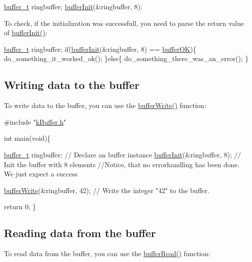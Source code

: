 \begin{DoxyCode}
\hyperlink{structbuffer__t}{buffer\_t} ringbuffer;
\hyperlink{k_buffer_8c_aec18d6ea571b1326dbeb7ca15f4969c0}{bufferInit}(&ringbuffer, 8);
\end{DoxyCode}
 To check, if the initialization was successfull, you need to parse the return value of \hyperlink{k_buffer_8c_aec18d6ea571b1326dbeb7ca15f4969c0}{buffer\+Init()}\+: 
\begin{DoxyCode}
\hyperlink{structbuffer__t}{buffer\_t} ringbuffer;
\textcolor{keywordflow}{if}(\hyperlink{k_buffer_8c_aec18d6ea571b1326dbeb7ca15f4969c0}{bufferInit}(&ringbuffer, 8) == \hyperlink{k_buffer_8h_a7a0bf550b7bd49d85172e409c0034fe6a69e32851bd2f089b06555decd80aac1b}{bufferOK})\{
 do\_something\_it\_worked\_ok();
\}\textcolor{keywordflow}{else}\{
 do\_something\_there\_was\_an\_error();
\}
\end{DoxyCode}
 \hypertarget{index_write}{}\subsection{Writing data to the buffer}\label{index_write}
To write data to the buffer, you can use the \hyperlink{k_buffer_8c_a9d6410a89adf65a3ef12340ecb9bbd55}{buffer\+Write()} function\+: 
\begin{DoxyCode}
\textcolor{preprocessor}{#include "\hyperlink{k_buffer_8h}{kBuffer.h}"}

\textcolor{keywordtype}{int} main(\textcolor{keywordtype}{void})\{

 \hyperlink{structbuffer__t}{buffer\_t} ringbuffer;            \textcolor{comment}{// Declare an buffer instance}
 \hyperlink{k_buffer_8c_aec18d6ea571b1326dbeb7ca15f4969c0}{bufferInit}(&ringbuffer, 8);     \textcolor{comment}{// Init the buffer with 8 elements}
 \textcolor{comment}{//Notice, that no errorhandling has been done. We just expect a success}
 
 \hyperlink{k_buffer_8c_a9d6410a89adf65a3ef12340ecb9bbd55}{bufferWrite}(&ringbuffer, 42);   \textcolor{comment}{// Write the integer "42" to the buffer.}

 \textcolor{keywordflow}{return} 0;
\}
\end{DoxyCode}
 \hypertarget{index_read}{}\subsection{Reading data from the buffer}\label{index_read}
To read data from the buffer, you can use the \hyperlink{k_buffer_8c_a9b80be9033ccd6b5a101f811520ab4cc}{buffer\+Read()} function\+: 
